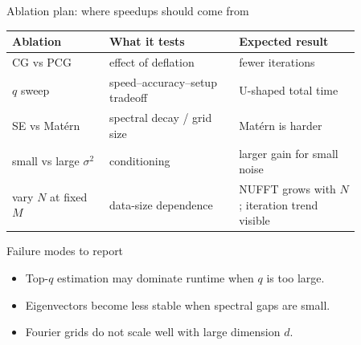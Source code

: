 \documentclass[aspectratio=169,11pt]{ctexbeamer}
\begin{document}
\begin{frame}{Ablation plan: where speedups should come from}
\small
\begin{center}
\begin{tabular}{p{0.24\linewidth}p{0.32\linewidth}p{0.30\linewidth}}
\toprule
Ablation & What it tests & Expected result \\
\midrule
CG vs PCG & effect of deflation & fewer iterations \\
$q$ sweep & speed--accuracy--setup tradeoff & U-shaped total time \\
SE vs Mat\'ern & spectral decay / grid size & Mat\'ern is harder \\
small vs large $\sigma^2$ & conditioning & larger gain for small noise \\
vary $N$ at fixed $M$ & data-size dependence & NUFFT grows with $N$; iteration trend visible \\
\bottomrule
\end{tabular}
\end{center}
\vspace{0.16cm}
\begin{block}{Failure modes to report}
\begin{itemize}
  \item Top-$q$ estimation may dominate runtime when $q$ is too large.
  \item Eigenvectors become less stable when spectral gaps are small.
  \item Fourier grids do not scale well with large dimension $d$.
\end{itemize}
\end{block}
\end{frame}
\end{document}
